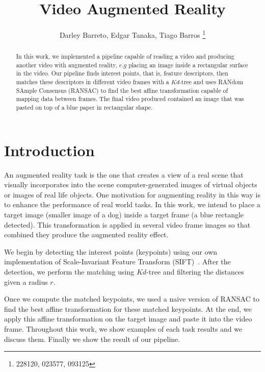 \documentclass[]{IEEEtran}
\begin{document}
  \title{Video Augmented Reality}
  \author{Darley Barreto, Edgar Tanaka, Tiago Barros
    \thanks{228120, 023577, 093125}
  }
  \maketitle

  \begin{abstract}
    In this work, we implemented a pipeline capable of reading a video and producing another video with augmented reality, $e.g$ placing an image inside a rectangular surface in the video. Our pipeline finds interest points, that is, feature descriptors, then matches these descriptors in different video frames with a $Kd$-tree and uses RANdom SAmple Consensus (RANSAC) to find the best affine transformation capable of mapping data between frames. The final video produced contained an image that was pasted on top of a blue paper in rectangular shape.
  \end{abstract}

  \section{Introduction}
    An augmented reality task is the one that creates a view of a real scene that visually incorporates into the scene computer-generated images of virtual objects or images of real life objects. One motivation for augmenting reality in this way is to enhance the performance of real world tasks. In this work, we intend to place a target image (smaller image of a dog) inside a target frame (a blue rectangle detected). This transformation is applied in several video frame images so that combined they produce the augmented reality effect.

    We begin by detecting the interest points (keypoints) using our own implementation of Scale-Invariant Feature Transform (SIFT)~\cite{iccv99}. After the detection, we perform the matching using $Kd$-tree and filtering the distances given a radius $r$.

    Once we compute the matched keypoints, we used a naive version of RANSAC\cite{ransac} to find the best affine transformation for these matched keypoints. At the end, we apply this affine transformation on the target image and paste it into the video frame. Throughout this work, we show examples of each task results and we discuss them. Finally we show the result of our pipeline.
\end{document}
